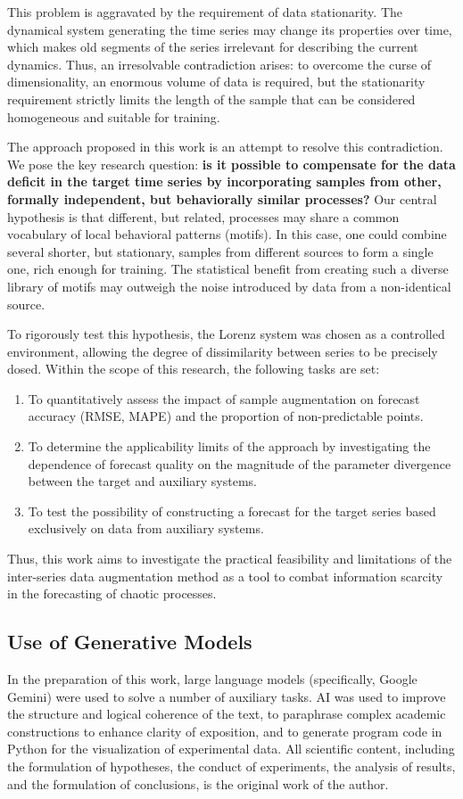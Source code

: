 \documentclass[a4paper,12pt]{extarticle}
\begin{document}
This problem is aggravated by the requirement of data stationarity. The dynamical system
generating the time series may change its properties over time, which
makes old segments of the series irrelevant for describing the current dynamics. Thus,
an irresolvable contradiction arises: to overcome the curse of dimensionality,
 an enormous volume of data is required, but the stationarity requirement strictly limits
 the length of the sample that can be considered homogeneous and suitable for training.

The approach proposed in this work is an attempt to resolve this contradiction.
 We pose the key research question: \textbf{is it possible to compensate for the
  data deficit in the target time series by incorporating samples from other,
   formally independent, but behaviorally similar processes?} Our central hypothesis
    is that different, but related, processes may share a common
     vocabulary of local behavioral patterns (motifs). In this case, one could
     combine several shorter, but stationary, samples from different sources
      to form a single one, rich enough for training. The statistical benefit
      from creating such a diverse library of motifs may outweigh the noise introduced
      by data from a non-identical source.

To rigorously test this hypothesis, the Lorenz system was chosen
 as a controlled environment, allowing the degree of dissimilarity between series to be precisely dosed.
  Within the scope of this research, the following tasks are set:
\begin{enumerate}
    \item To quantitatively assess the impact of sample augmentation on forecast accuracy
    (RMSE, MAPE) and the proportion of non-predictable points.
    \item To determine the applicability limits of the approach by investigating the dependence
     of forecast quality on the magnitude of the parameter divergence between the target and auxiliary systems.
    \item To test the possibility of constructing a forecast for the target series
    based exclusively on data from auxiliary systems.
\end{enumerate}
Thus, this work aims to investigate the practical feasibility and limitations of the inter-series data augmentation method as a tool to combat information scarcity in the forecasting of chaotic processes.

\subsection{Use of Generative Models}
In the preparation of this work, large language models
 (specifically, Google Gemini) were used to solve a number of auxiliary tasks. AI
 was used to improve the structure and logical coherence of the text, to paraphrase
 complex academic constructions to enhance clarity of exposition, and to
 generate program code in Python for the visualization of experimental data.
  All scientific content, including the formulation of hypotheses, the conduct of experiments, the analysis of results,
   and the formulation of conclusions, is the original work of the author.
\end{document}
